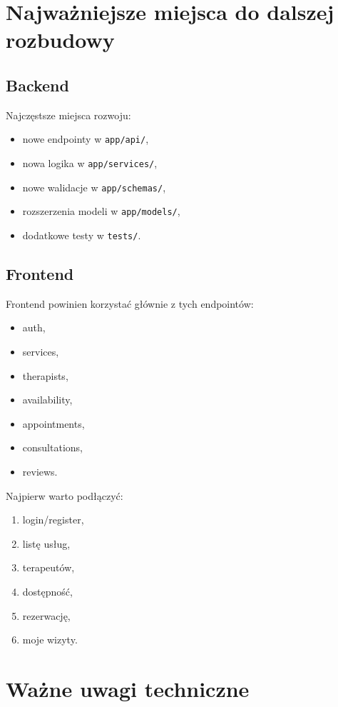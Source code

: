 \documentclass[11pt,a4paper]{article}
\begin{document}
\section{Najważniejsze miejsca do dalszej rozbudowy}

\subsection{Backend}
Najczęstsze miejsca rozwoju:
\begin{itemize}[leftmargin=1.2cm]
    \item nowe endpointy w \texttt{app/api/},
    \item nowa logika w \texttt{app/services/},
    \item nowe walidacje w \texttt{app/schemas/},
    \item rozszerzenia modeli w \texttt{app/models/},
    \item dodatkowe testy w \texttt{tests/}.
\end{itemize}

\subsection{Frontend}
Frontend powinien korzystać głównie z tych endpointów:
\begin{itemize}[leftmargin=1.2cm]
    \item auth,
    \item services,
    \item therapists,
    \item availability,
    \item appointments,
    \item consultations,
    \item reviews.
\end{itemize}

Najpierw warto podłączyć:
\begin{enumerate}[leftmargin=1.2cm]
    \item login/register,
    \item listę usług,
    \item terapeutów,
    \item dostępność,
    \item rezerwację,
    \item moje wizyty.
\end{enumerate}

\section{Ważne uwagi techniczne}
\end{document}
